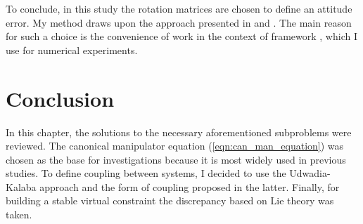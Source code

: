 To conclude, in this study the rotation matrices are chosen to define an
attitude error. My method draws upon the approach presented in
\cite{OutFeedbackStabForOrbRob} and \cite{ANonlinearObserverUsingPose}.
The main reason for such a choice is the convenience of work in the context of
framework \cite{Pinocchio}, which I use for numerical experiments.

\section{Conclusion} \label{sec:lr_conclusion}

In this chapter, the solutions to the necessary aforementioned subproblems
were reviewed. The canonical manipulator equation (\ref{eqn:can_man_equation})
was chosen as the base for investigations because it is most widely used in previous 
studies. To define coupling between systems, I decided to
use the Udwadia-Kalaba approach and the form of coupling proposed in the latter.
Finally, for building a stable virtual constraint the discrepancy based
on Lie theory was taken.



